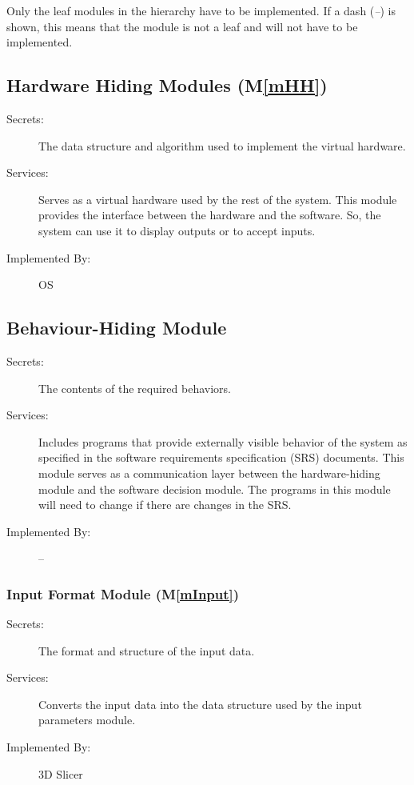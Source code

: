 \documentclass[12pt, titlepage]{article}
\newcommand{\mref}[1]{M\ref{#1}}
\begin{document}
Only the leaf modules in the hierarchy have to be implemented. If a dash
(\emph{--}) is shown, this means that the module is not a leaf and will not have
to be implemented.

\subsection{Hardware Hiding Modules (\mref{mHH})}

\begin{description}
\item[Secrets:]The data structure and algorithm used to implement the virtual
  hardware.
\item[Services:]Serves as a virtual hardware used by the rest of the
  system. This module provides the interface between the hardware and the
  software. So, the system can use it to display outputs or to accept inputs.
\item[Implemented By:] OS
\end{description}

\subsection{Behaviour-Hiding Module}

\begin{description}
\item[Secrets:]The contents of the required behaviors.
\item[Services:]Includes programs that provide externally visible behavior of
  the system as specified in the software requirements specification (SRS)
  documents. This module serves as a communication layer between the
  hardware-hiding module and the software decision module. The programs in this
  module will need to change if there are changes in the SRS.
\item[Implemented By:] --
\end{description}

\subsubsection{Input Format Module (\mref{mInput})}
\begin{description}
\item[Secrets:]The format and structure of the input data.
\item[Services:]Converts the input data into the data structure used by the input parameters module.
\item[Implemented By:] 3D Slicer
\end{description}
\end{document}
